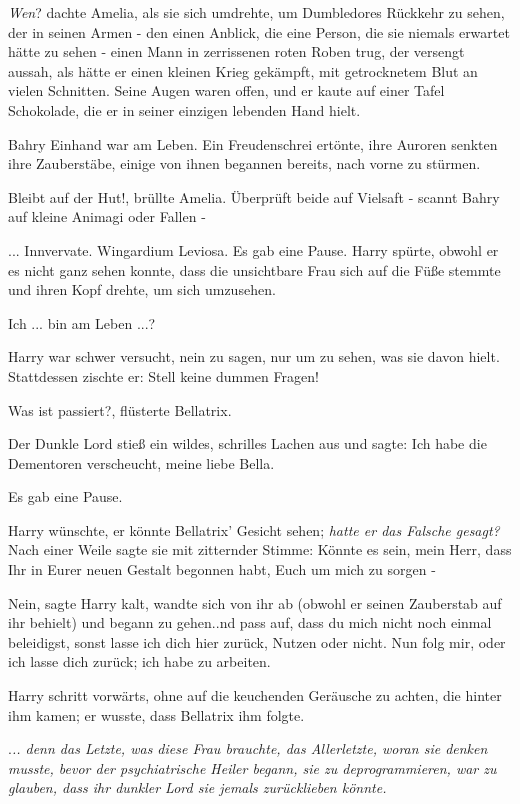 \emph{Wen}? dachte Amelia, als sie sich umdrehte, um Dumbledores Rückkehr zu
sehen, der in seinen Armen - den einen Anblick, die eine Person, die sie niemals
erwartet hätte zu sehen - einen Mann in zerrissenen roten Roben trug, der
versengt aussah, als hätte er einen kleinen Krieg gekämpft, mit getrocknetem
Blut an vielen Schnitten. Seine Augen waren offen, und er kaute auf einer Tafel
Schokolade, die er in seiner einzigen lebenden Hand hielt.

Bahry Einhand war am Leben. Ein Freudenschrei ertönte, ihre Auroren senkten ihre
Zauberstäbe, einige von ihnen begannen bereits, nach vorne zu stürmen.

\glqq{}Bleibt auf der Hut!\grqq{}, brüllte Amelia. \glqq{}Überprüft beide auf
Vielsaft - scannt Bahry auf kleine Animagi oder Fallen -\grqq{}

... \glqq{}Innvervate. Wingardium Leviosa.\grqq{} Es gab eine Pause. Harry spürte,
obwohl er es nicht ganz sehen konnte, dass die unsichtbare Frau sich auf die
Füße stemmte und ihren Kopf drehte, um sich umzusehen.

\glqq{}Ich ... bin am Leben ...?\grqq{}

Harry war schwer versucht, nein zu sagen, nur um zu sehen, was sie davon hielt.
Stattdessen zischte er: \glqq{}Stell keine dummen Fragen!\grqq{}

\glqq{}Was ist passiert?\grqq{}, flüsterte Bellatrix.

Der Dunkle Lord stieß ein wildes, schrilles Lachen aus und sagte: \glqq{}Ich habe
die Dementoren verscheucht, meine liebe Bella.\grqq{}

Es gab eine Pause.

Harry wünschte, er könnte Bellatrix' Gesicht sehen; \emph{hatte er das Falsche
gesagt?} Nach einer Weile sagte sie mit zitternder Stimme: \glqq{}Könnte es sein,
mein Herr, dass Ihr in Eurer neuen Gestalt begonnen habt, Euch um mich zu sorgen
-\grqq{}

\glqq{}Nein\grqq{}, sagte Harry kalt, wandte sich von ihr ab (obwohl er seinen
Zauberstab auf ihr behielt) und begann zu gehen.\grqq{}.nd pass auf, dass du
mich nicht noch einmal beleidigst, sonst lasse ich dich hier zurück, Nutzen oder
nicht. Nun folg mir, oder ich lasse dich zurück; ich habe zu arbeiten.\grqq{}

Harry schritt vorwärts, ohne auf die keuchenden Geräusche zu achten, die hinter
ihm kamen; er wusste, dass Bellatrix ihm folgte.

.\emph{.. denn das Letzte, was diese Frau brauchte, das Allerletzte, woran sie
denken musste, bevor der psychiatrische Heiler begann, sie zu deprogrammieren,
war zu glauben, dass ihr dunkler Lord sie jemals zurücklieben könnte.}

